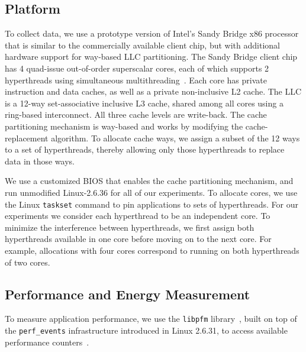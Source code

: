 \subsection*{Platform}

To collect data, we use a prototype version of Intel's Sandy Bridge x86 processor that is similar to the
commercially available client chip, but with additional hardware
support for way-based LLC partitioning. 
The Sandy Bridge client chip has 4 quad-issue out-of-order
superscalar cores, each of which supports 2 hyperthreads using
simultaneous multithreading~\cite{IntelRefManual:2011}.  Each core has
private  instruction and data caches, as well as a
 private non-inclusive L2 cache.  The LLC is a 12-way
set-associative  inclusive L3 cache, shared among all
cores using a ring-based interconnect.  All three cache levels are
write-back.   The cache partitioning mechanism is way-based and works by modifying the
cache-replacement algorithm.  To allocate cache ways, we assign a subset of
the 12 ways to a set of hyperthreads, thereby allowing only those hyperthreads to replace data in those ways. 


We use a customized BIOS that enables the cache partitioning
mechanism, and run unmodified Linux-2.6.36 for all of our experiments.
To allocate cores, we use the Linux {\tt taskset} command to pin applications to
sets of hyperthreads.  For our experiments we consider each hyperthread to be an independent core. To minimize the interference between hyperthreads, we first assign both hyperthreads available in one core before moving on to the next core. For example, allocations with four cores correspond to running on both hyperthreads of two cores. 

\subsection*{Performance and Energy Measurement}

To measure application performance, we use the \texttt{libpfm}
library~\cite{Eranian:OLS06,Perfmon2}, built on top of the
\texttt{perf\_events} infrastructure introduced in Linux 2.6.31, to
access available performance counters~\cite{Intel:Manual2012}.

